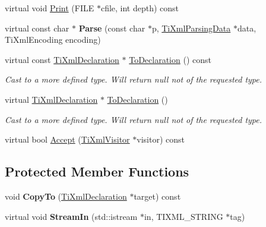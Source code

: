 \begin{DoxyCompactItemize}
\item 
virtual void \hyperlink{class_ti_xml_declaration_abf6303db4bd05b5be554036817ff1cb4}{Print} (F\+I\+L\+E $\ast$cfile, int depth) const 
\item 
\hypertarget{class_ti_xml_declaration_a9839ea97ed687a2b7342fd7b0f04361b}{virtual const char $\ast$ {\bfseries Parse} (const char $\ast$p, \hyperlink{class_ti_xml_parsing_data}{Ti\+Xml\+Parsing\+Data} $\ast$data, Ti\+Xml\+Encoding encoding)}\label{class_ti_xml_declaration_a9839ea97ed687a2b7342fd7b0f04361b}

\item 
\hypertarget{class_ti_xml_declaration_a1e085d3fefd1dbf5ccdbff729931a967}{virtual const \hyperlink{class_ti_xml_declaration}{Ti\+Xml\+Declaration} $\ast$ \hyperlink{class_ti_xml_declaration_a1e085d3fefd1dbf5ccdbff729931a967}{To\+Declaration} () const }\label{class_ti_xml_declaration_a1e085d3fefd1dbf5ccdbff729931a967}

\begin{DoxyCompactList}\small\item\em Cast to a more defined type. Will return null not of the requested type. \end{DoxyCompactList}\item 
\hypertarget{class_ti_xml_declaration_a6bd3d1daddcaeb9543c24bfd090969ce}{virtual \hyperlink{class_ti_xml_declaration}{Ti\+Xml\+Declaration} $\ast$ \hyperlink{class_ti_xml_declaration_a6bd3d1daddcaeb9543c24bfd090969ce}{To\+Declaration} ()}\label{class_ti_xml_declaration_a6bd3d1daddcaeb9543c24bfd090969ce}

\begin{DoxyCompactList}\small\item\em Cast to a more defined type. Will return null not of the requested type. \end{DoxyCompactList}\item 
virtual bool \hyperlink{class_ti_xml_declaration_ab6a6b178161ba9abc2c35058de689864}{Accept} (\hyperlink{class_ti_xml_visitor}{Ti\+Xml\+Visitor} $\ast$visitor) const 
\end{DoxyCompactItemize}
\subsection*{Protected Member Functions}
\begin{DoxyCompactItemize}
\item 
\hypertarget{class_ti_xml_declaration_a9d08959f935421a593032bd3efb30c38}{void {\bfseries Copy\+To} (\hyperlink{class_ti_xml_declaration}{Ti\+Xml\+Declaration} $\ast$target) const }\label{class_ti_xml_declaration_a9d08959f935421a593032bd3efb30c38}

\item 
\hypertarget{class_ti_xml_declaration_af90df1c54c89b0f8dd56168419967610}{virtual void {\bfseries Stream\+In} (std\+::istream $\ast$in, T\+I\+X\+M\+L\+\_\+\+S\+T\+R\+I\+N\+G $\ast$tag)}\label{class_ti_xml_declaration_af90df1c54c89b0f8dd56168419967610}

\end{DoxyCompactItemize}
